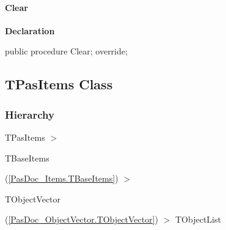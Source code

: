 \documentclass{report}
\newif\ifpdf
\begin{document}
\paragraph*{Clear}\hspace*{\fill}

\label{PasDoc_Items.TBaseItems-Clear}
\begin{list}{}{
\setlength{\itemindent}{0cm}
\setlength{\listparindent}{0cm}
\setlength{\leftmargin}{\evensidemargin}
\addtolength{\leftmargin}{\tmplength}
\settowidth{\labelsep}{X}
\addtolength{\leftmargin}{\labelsep}
\setlength{\labelwidth}{\tmplength}
}
\item[\textbf{Declaration}\hfill]
\ifpdf
\begin{flushleft}
\fi
\begin{ttfamily}
public procedure Clear; override;\end{ttfamily}

\ifpdf
\end{flushleft}
\fi

\end{list}
\ifpdf
\subsection*{\large{\textbf{TPasItems Class}}\normalsize\hspace{1ex}\hrulefill}
\else
\subsection*{TPasItems Class}
\fi
\label{PasDoc_Items.TPasItems}
\subsubsection*{\large{\textbf{Hierarchy}}\normalsize\hspace{1ex}\hfill}
TPasItems {$>$} \begin{ttfamily}TBaseItems\end{ttfamily}(\ref{PasDoc_Items.TBaseItems}) {$>$} \begin{ttfamily}TObjectVector\end{ttfamily}(\ref{PasDoc_ObjectVector.TObjectVector}) {$>$} 
TObjectList
\end{document}

